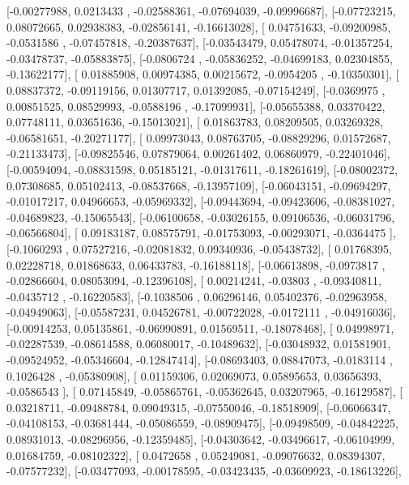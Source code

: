 \documentclass{article}
\begin{document}
       [-0.00277988,  0.0213433 , -0.02588361, -0.07694039, -0.09996687],
       [-0.07723215,  0.08072665,  0.02938383, -0.02856141, -0.16613028],
       [ 0.04751633, -0.09200985, -0.0531586 , -0.07457818, -0.20387637],
       [-0.03543479,  0.05478074, -0.01357254, -0.03478737, -0.05883875],
       [-0.0806724 , -0.05836252, -0.04699183,  0.02304855, -0.13622177],
       [ 0.01885908,  0.00974385,  0.00215672, -0.0954205 , -0.10350301],
       [ 0.08837372, -0.09119156,  0.01307717,  0.01392085, -0.07154249],
       [-0.0369975 ,  0.00851525,  0.08529993, -0.0588196 , -0.17099931],
       [-0.05655388,  0.03370422,  0.07748111,  0.03651636, -0.15013021],
       [ 0.01863783,  0.08209505,  0.03269328, -0.06581651, -0.20271177],
       [ 0.09973043,  0.08763705, -0.08829296,  0.01572687, -0.21133473],
       [-0.09825546,  0.07879064,  0.00261402,  0.06860979, -0.22401046],
       [-0.00594094, -0.08831598,  0.05185121, -0.01317611, -0.18261619],
       [-0.08002372,  0.07308685,  0.05102413, -0.08537668, -0.13957109],
       [-0.06043151, -0.09694297, -0.01017217,  0.04966653, -0.05969332],
       [-0.09443694, -0.09423606, -0.08381027, -0.04689823, -0.15065543],
       [-0.06100658, -0.03026155,  0.09106536, -0.06031796, -0.06566804],
       [ 0.09183187,  0.08575791, -0.01753093, -0.00293071, -0.0364475 ],
       [-0.1060293 ,  0.07527216, -0.02081832,  0.09340936, -0.05438732],
       [ 0.01768395,  0.02228718,  0.01868633,  0.06433783, -0.16188118],
       [-0.06613898, -0.0973817 , -0.02866604,  0.08053094, -0.12396108],
       [ 0.00214241, -0.03803   , -0.09340811, -0.0435712 , -0.16220583],
       [-0.1038506 ,  0.06296146,  0.05402376, -0.02963958, -0.04949063],
       [-0.05587231,  0.04526781, -0.00722028, -0.0172111 , -0.04916036],
       [-0.00914253,  0.05135861, -0.06990891,  0.01569511, -0.18078468],
       [ 0.04998971, -0.02287539, -0.08614588,  0.06080017, -0.10489632],
       [-0.03048932,  0.01581901, -0.09524952, -0.05346604, -0.12847414],
       [-0.08693403,  0.08847073, -0.0183114 ,  0.1026428 , -0.05380908],
       [ 0.01159306,  0.02069073,  0.05895653,  0.03656393, -0.0586543 ],
       [ 0.07145849, -0.05865761, -0.05362645,  0.03207965, -0.16129587],
       [ 0.03218711, -0.09488784,  0.09049315, -0.07550046, -0.18518909],
       [-0.06066347, -0.04108153, -0.03681444, -0.05086559, -0.08909475],
       [-0.09498509, -0.04842225,  0.08931013, -0.08296956, -0.12359485],
       [-0.04303642, -0.03496617, -0.06104999,  0.01684759, -0.08102322],
       [ 0.0472658 ,  0.05249081, -0.09076632,  0.08394307, -0.07577232],
       [-0.03477093, -0.00178595, -0.03423435, -0.03609923, -0.18613226],
\end{document}
